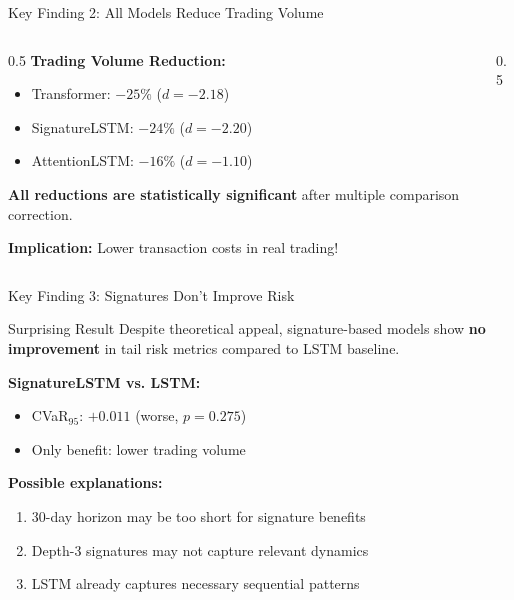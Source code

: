 \documentclass[aspectratio=169,11pt]{beamer}
\begin{document}
\begin{frame}{Key Finding 2: All Models Reduce Trading Volume}
\begin{columns}
\begin{column}{0.5\textwidth}
\textbf{Trading Volume Reduction:}
\begin{itemize}
    \item Transformer: $-25\%$ ($d = -2.18$)
    \item SignatureLSTM: $-24\%$ ($d = -2.20$)
    \item AttentionLSTM: $-16\%$ ($d = -1.10$)
\end{itemize}

\vspace{0.3cm}
\textbf{All reductions are statistically significant} after multiple comparison correction.

\vspace{0.3cm}
\textbf{Implication:} Lower transaction costs in real trading!
\end{column}
\begin{column}{0.5\textwidth}
\end{column}
\end{columns}
\end{frame}

\begin{frame}{Key Finding 3: Signatures Don't Improve Risk}
\begin{alertblock}{Surprising Result}
Despite theoretical appeal, signature-based models show \textbf{no improvement} in tail risk metrics compared to LSTM baseline.
\end{alertblock}

\vspace{0.3cm}
\textbf{SignatureLSTM vs. LSTM:}
\begin{itemize}
    \item CVaR$_{95}$: $+0.011$ (worse, $p = 0.275$)
    \item Only benefit: lower trading volume
\end{itemize}

\vspace{0.3cm}
\textbf{Possible explanations:}
\begin{enumerate}
    \item 30-day horizon may be too short for signature benefits
    \item Depth-3 signatures may not capture relevant dynamics
    \item LSTM already captures necessary sequential patterns
\end{enumerate}
\end{frame}
\end{document}
